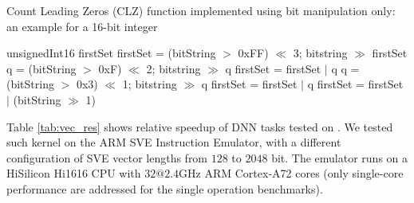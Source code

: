 \begin{algorithm}
 \caption{ Count Leading Zeros (CLZ) function implemented using bit manipulation only: an example for a 16-bit integer}
 \label{alg:clz}
 \begin{algorithmic}[1]
   \renewcommand{\algorithmicrequire}{\textbf{Input:}}
 \renewcommand{\algorithmicensure}{\textbf{Output:}}
 \Require unsignedInt16
 \Ensure firstSet
  \State firstSet = (bitString $>$ 0xFF) $\ll$ 3; bitstring $\gg$ firstSet
  \State q = (bitString $>$ 0xF) $\ll$ 2; bitstring $\gg$ q
  \State firstSet = firstSet $|$ q
  \State q = (bitString $>$ 0x3) $\ll$ 1; bitstring $\gg$ q
  \State firstSet = firstSet $|$ q
  \State firstSet = firstSet $|$ (bitString $\gg$ 1)
 \end{algorithmic}
\end{algorithm}
Table \ref{tab:vec_res} shows relative speedup of DNN tasks tested on .  We tested such kernel on the ARM SVE Instruction Emulator, with a different configuration of SVE vector lengths from $128$ to $2048$ bit. The emulator runs on a HiSilicon Hi1616 CPU with $32@2.4\text{GHz}$ ARM Cortex-A72 cores (only single-core performance are addressed for the single operation benchmarks).
